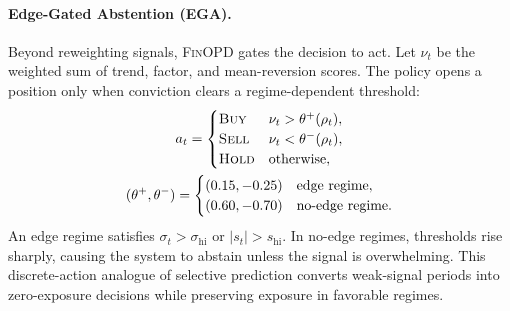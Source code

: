 \paragraph{Edge-Gated Abstention (EGA).}
Beyond reweighting signals, \textsc{FinOPD} gates the decision to act. Let $\nu_t$ be the weighted sum of trend, factor, and mean-reversion scores. The policy opens a position only when conviction clears a regime-dependent threshold:
\begin{equation}
\label{eq:ega}
\begin{gathered}
a_t =
\begin{cases}
\textsc{Buy} & \nu_t > \theta^{+}(\rho_t), \\
\textsc{Sell} & \nu_t < \theta^{-}(\rho_t), \\
\textsc{Hold} & \text{otherwise},
\end{cases}\\
(\theta^{+},\theta^{-})=
\begin{cases}
(0.15,-0.25) & \text{edge regime}, \\
(0.60,-0.70) & \text{no-edge regime.}
\end{cases}
\end{gathered}
\end{equation}
An edge regime satisfies $\sigma_t>\sigma_{\mathrm{hi}}$ or $|s_t|>s_{\mathrm{hi}}$. In no-edge regimes, thresholds rise sharply, causing the system to abstain unless the signal is overwhelming. This discrete-action analogue of selective prediction converts weak-signal periods into zero-exposure decisions while preserving exposure in favorable regimes.



